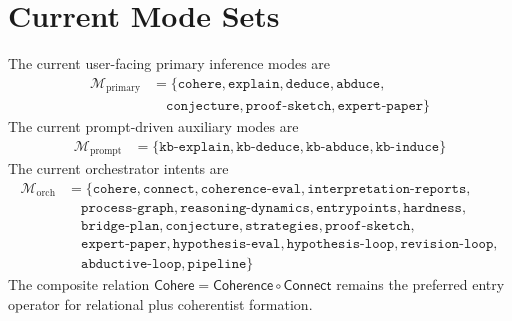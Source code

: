 \documentclass[11pt]{article}
\begin{document}
\section{Current Mode Sets}
The current user-facing primary inference modes are
\[
\begin{aligned}
\mathcal{M}_{\mathrm{primary}} &= \{\texttt{cohere}, \texttt{explain}, \texttt{deduce}, \texttt{abduce},\\
&\quad \texttt{conjecture}, \texttt{proof-sketch}, \texttt{expert-paper}\}
\end{aligned}
\]
The current prompt-driven auxiliary modes are
\[
\begin{aligned}
\mathcal{M}_{\mathrm{prompt}} &= \{\texttt{kb-explain}, \texttt{kb-deduce}, \texttt{kb-abduce}, \texttt{kb-induce}\}
\end{aligned}
\]
The current orchestrator intents are
\[
\begin{aligned}
\mathcal{M}_{\mathrm{orch}} &= \{\texttt{cohere}, \texttt{connect}, \texttt{coherence-eval}, \texttt{interpretation-reports},\\
&\quad \texttt{process-graph}, \texttt{reasoning-dynamics}, \texttt{entrypoints}, \texttt{hardness},\\
&\quad \texttt{bridge-plan}, \texttt{conjecture}, \texttt{strategies}, \texttt{proof-sketch},\\
&\quad \texttt{expert-paper}, \texttt{hypothesis-eval}, \texttt{hypothesis-loop}, \texttt{revision-loop},\\
&\quad \texttt{abductive-loop}, \texttt{pipeline}\}
\end{aligned}
\]
The composite relation \(\mathsf{Cohere} = \mathsf{Coherence} \circ \mathsf{Connect}\) remains the preferred entry operator for relational plus coherentist formation.
\end{document}
